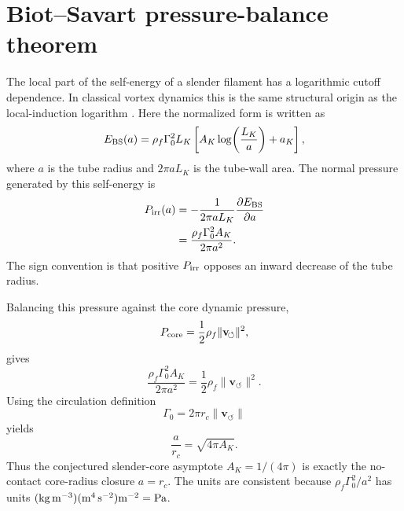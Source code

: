 \documentclass[aps,pra,preprint,longbibliography,nofootinbib]{revtex4-2}
\newcommand{\vnorm}{\lVert\mathbf{v}_{\!\boldsymbol{\circlearrowleft}}\rVert} %
\begin{document}
\section{Biot--Savart pressure-balance theorem}
\label{app:bs_pressure}

The local part of the self-energy of a slender filament has a logarithmic
cutoff dependence.  In classical vortex dynamics this is the same structural
origin as the local-induction logarithm \cite{Saffman1992,Batchelor1967}.
Here the normalized form is written as
\begin{equation}
  E_{\rm BS}(a)
  =\rho_f \Gamma_0^2 L_K
   \left[A_K\log\!\left(\frac{L_K}{a}\right)+a_K\right],
  \label{eq:app_bs_energy}
\end{equation}
where $a$ is the tube radius and $2\pi aL_K$ is the tube-wall area.  The
normal pressure generated by this self-energy is
\begin{align}
  P_{\rm irr}(a)
  &=-\frac{1}{2\pi aL_K}\frac{\partial E_{\rm BS}}{\partial a}
    \nonumber\\
  &=\frac{\rho_f\Gamma_0^2A_K}{2\pi a^2}.
  \label{eq:app_pirr}
\end{align}
The sign convention is that positive $P_{\rm irr}$ opposes an inward decrease
of the tube radius.

Balancing this pressure against the core dynamic pressure,
\begin{equation}
  P_{\rm core}=\frac{1}{2}\rho_f\vnorm^2,
  \label{eq:app_pcore}
\end{equation}
gives
\begin{equation}
  \frac{\rho_f\Gamma_0^2 A_K}{2\pi a^2}
  =\frac{1}{2}\rho_f\vnorm^2 .
  \label{eq:app_balance}
\end{equation}
Using the circulation definition
\begin{equation}
  \Gamma_0=2\pi r_c\vnorm
  \label{eq:app_gamma}
\end{equation}
yields
\begin{equation}
  \boxed{\frac{a}{r_c}=\sqrt{4\pi A_K}} .
  \label{eq:app_anc}
\end{equation}
Thus the conjectured slender-core asymptote $A_K=1/(4\pi)$ is exactly the
no-contact core-radius closure $a=r_c$.  The units are consistent because
$\rho_f\Gamma_0^2/a^2$ has units
$({\rm kg\,m^{-3}})({\rm m^4\,s^{-2}}){\rm m^{-2}}={\rm Pa}$.

\end{document}
